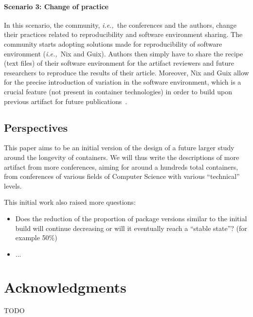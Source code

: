 \documentclass[sigconf,natbib=false]{acmart}
\newcommand{\ie}{\emph{i.e.,}}
\begin{document}
\paragraph{Scenario 3: Change of practice}
In this scenario, the community, \ie\ the conferences and the authors, change their practices related to reproducibility and software environment sharing.
The community starts adopting solutions made for reproducibility of software environment (\ie\ Nix and Guix).
Authors then simply have to share the recipe (text files) of their software environment for the artifact reviewers and future researchers to reproduce the results of their article.
Moreover, Nix and Guix allow for the precise introduction of variation in the software environment, which is a crucial feature (not present in container technologies) in order to build upon previous artifact for future publications~\cite{mercier2018considering}.


\subsection{Perspectives}

This paper aims to be an initial version of the design of a future larger study around the longevity of containers.
We will thus write the descriptions of more artifact from more conferences, aiming for around a hundreds total containers, from conferences of various fields of Computer Science with various ``technical'' levels.

This initial work also raised more questions:
\begin{itemize}
\item Does the reduction of the proportion of package versions similar to the initial build will continue decreasing or will it eventually reach a ``stable state''? (for example 50\%)
\item ...
\end{itemize}

%

\section*{Acknowledgments}

TODO


\newpage
\newpage
%
%
\printbibliography
\end{document}
